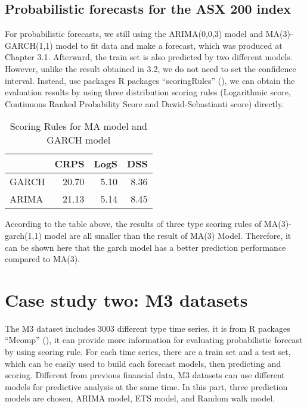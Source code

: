 \documentclass{monashthesis}
\theoremstyle{definition}
\theoremstyle{definition}
\theoremstyle{definition}
\theoremstyle{remark}
\begin{document}
\section{Probabilistic forecasts for the ASX 200
index}\label{probabilistic-forecasts-for-the-asx-200-index}

For probabilistic forecasts, we still using the ARIMA(0,0,3) model and
MA(3)-GARCH(1,1) model to fit data and make a forecast, which was
produced at Chapter 3.1. Afterward, the train set is also predicted by
two different models. However, unlike the result obtained in 3.2, we do
not need to set the confidence interval. Instead, use packages R
packages ``scoringRules'' (\textcite{JKL17}), we can obtain the
evaluation results by using three distribution scoring rules
(Logarithmic score, Continuous Ranked Probability Score and
Dawid-Sebastianti score) directly.

\begin{table}

\caption{\label{tab:table2}Scoring Rules for MA model and GARCH model}
\centering
\begin{tabular}[t]{lrrr}
\toprule
  & CRPS & LogS & DSS\\
\midrule
GARCH & 20.70 & 5.10 & 8.36\\
ARIMA & 21.13 & 5.14 & 8.45\\
\bottomrule
\end{tabular}
\end{table}

According to the table above, the results of three type scoring rules of
MA(3)-garch(1,1) model are all smaller than the result of MA(3) Model.
Therefore, it can be shown here that the garch model has a better
prediction performance compared to MA(3).

\chapter{Case study two: M3 datasets}\label{case-study-two-m3-datasets}

The M3 dataset includes 3003 different type time series, it is from R
packages ``Mcomp'' (\textcite{RH182}), it can provide more information
for evaluating probabilistic forecast by using scoring rule. For each
time series, there are a train set and a test set, which can be easily
used to build each forecast models, then predicting and scoring.
Different from previous financial data, M3 datasets can use different
models for predictive analysis at the same time. In this part, three
prediction models are chosen, ARIMA model, ETS model, and Random walk
model.
\end{document}
